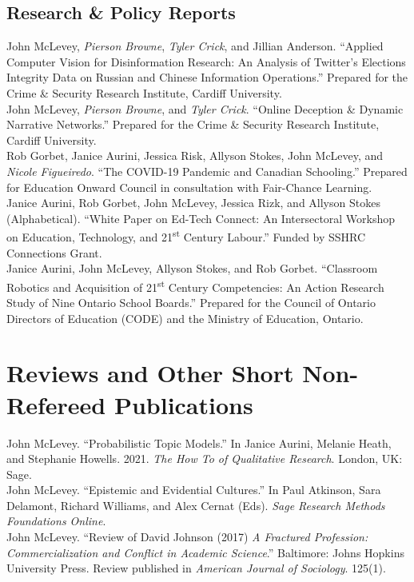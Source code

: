 \documentclass[11pt, a4paper]{article}
\newcommand{\note}[1]{\marginnote{\scriptsize #1}}
\begin{document}
\subsection*{Research \& Policy Reports}
\noindent
  \note{2020}John McLevey, \emph{Pierson Browne}, \emph{Tyler Crick},
and Jillian Anderson. ``Applied Computer Vision for Disinformation
Research: An Analysis of Twitter's Elections Integrity Data on Russian
and Chinese Information Operations.'' Prepared for the Crime \& Security
Research Institute, Cardiff University.\\[.2cm]
  \note{2020}John McLevey, \emph{Pierson Browne}, and \emph{Tyler
Crick}. ``Online Deception \& Dynamic Narrative Networks.'' Prepared for
the Crime \& Security Research Institute, Cardiff University.\\[.2cm]
  \note{2020}Rob Gorbet, Janice Aurini, Jessica Risk, Allyson Stokes,
John McLevey, and \emph{Nicole Figueiredo}. ``The COVID-19 Pandemic and
Canadian Schooling.'' Prepared for Education Onward Council in
consultation with Fair-Chance Learning.\\[.2cm]
  \note{2019}Janice Aurini, Rob Gorbet, John McLevey, Jessica Rizk, and
Allyson Stokes (Alphabetical). ``White Paper on Ed-Tech Connect: An
Intersectoral Workshop on Education, Technology, and
21\textsuperscript{st} Century Labour.'' Funded by SSHRC Connections
Grant.\\[.2cm]
  \note{2017}Janice Aurini, John McLevey, Allyson Stokes, and Rob
Gorbet. ``Classroom Robotics and Acquisition of 21\textsuperscript{st}
Century Competencies: An Action Research Study of Nine Ontario School
Boards.'' Prepared for the Council of Ontario Directors of Education
(CODE) and the Ministry of Education, Ontario.\\[.2cm]


\vspace{.2cm}
\section*{Reviews and Other Short Non-Refereed Publications}
\noindent
  \note{2021}John McLevey. ``Probabilistic Topic Models.'' In Janice
Aurini, Melanie Heath, and Stephanie Howells. 2021. \emph{The How To of
Qualitative Research}. London, UK: Sage.\\[.2cm]
  \note{2019}John McLevey. ``Epistemic and Evidential Cultures.'' In
Paul Atkinson, Sara Delamont, Richard Williams, and Alex Cernat (Eds).
\emph{Sage Research Methods Foundations Online}.\\[.2cm]
  \note{2019}John McLevey. ``Review of David Johnson (2017) \emph{A
Fractured Profession: Commercialization and Conflict in Academic
Science}.'' Baltimore: Johns Hopkins University Press. Review published
in \emph{American Journal of Sociology}. 125(1).\\[.2cm]
\end{document}
